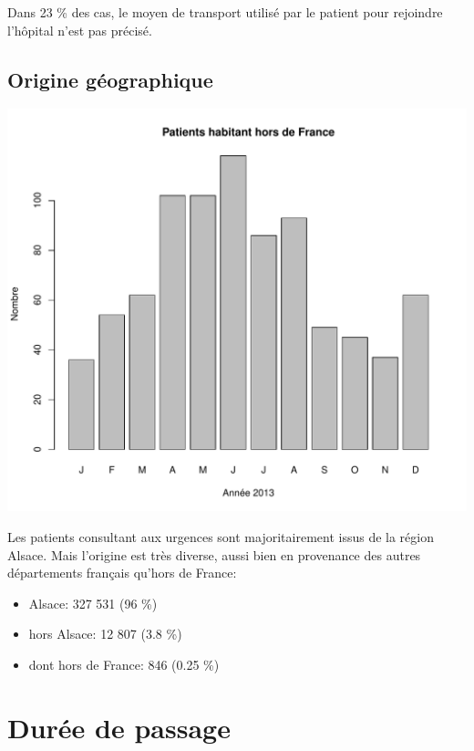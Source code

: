 \documentclass[12pt,english,french,twoside]{book}\usepackage[]{graphicx}\usepackage[]{color}
\makeatletter
\def\maxwidth{ %
  \ifdim\Gin@nat@width>\linewidth
    \linewidth
  \else
    \Gin@nat@width
  \fi
}
\newenvironment{knitrout}{}{} %
\makeatother
\begin{document}
Dans 23 \% des cas, le moyen de transport utilisé par le patient pour rejoindre l'hôpital n'est pas précisé.

\section*{Origine géographique}


\begin{knitrout}
\color{fgcolor}
\includegraphics[width=\maxwidth]{figure/origine_geo} 

\end{knitrout}

Les patients consultant aux urgences sont majoritairement issus de la région Alsace. Mais l'origine est très diverse, aussi bien en provenance des autres départements français qu'hors de France:
 \begin{itemize}
   \item Alsace: 327 531 (96 \%) 
   \item hors Alsace: 12 807 (3.8 \%) 
   \item dont hors de France: 846 (0.25 \%) 
 \end{itemize}


\newpage
\chapter{Durée de passage}
\end{document}
